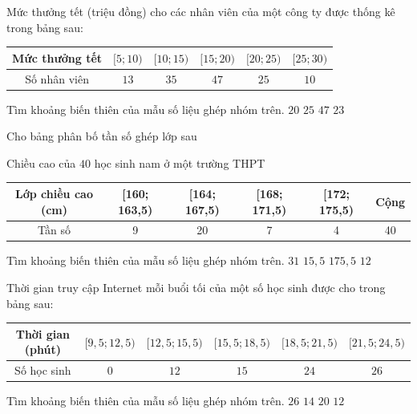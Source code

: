 \begin{ex}
	Mức thưởng tết (triệu đồng) cho các nhân viên của một công ty được thống kê trong bảng sau:
	\vspace*{-10pt}
	\begin{center}
		\begin{tabular}{|c|c|c|c|c|c|}
			\hline Mức thưởng tết & {$[5 ; 10)$} & {$[10 ; 15)$} & {$[15 ; 20)$} & {$[20 ; 25)$} &  {$[25 ;30)$} \\
			\hline Số nhân viên & $13$ & $35$ & $47$ & $25$ & $10$  \\
			\hline
		\end{tabular}
	\end{center}
	Tìm khoảng biến thiên của mẫu số liệu ghép nhóm trên.
	\choice
	{$20$}
	{\True $25$}
	{$47$}
	{$23$}
\end{ex}

\begin{ex}
	Cho bảng phân bố tần số ghép lớp sau
	\vspace*{-10pt}
	\begin{center}
		Chiều cao của $40$ học sinh nam ở một trường THPT\\
		\begin{tabular}{|c|c|c|c|c|c|}
			\hline
			Lớp chiều cao (cm) & [160; 163,5) & [164; 167,5) & [168; 171,5) & [172; 175,5) & Cộng\\
			\hline
			Tần số & 9 & 20 & 7 & 4 & 40\\
			\hline
		\end{tabular}
	\end{center}
	Tìm khoảng biến thiên của mẫu số liệu ghép nhóm trên.
	\choice
	{$31$}
	{\True $15,5$}
	{$175,5$}
	{$12$}
\end{ex}


\begin{ex}
	Thời gian truy cập Internet mỗi buổi tối của một số học sinh được cho trong bảng sau:
	\begin{center}
		\begin{tabular}{|c|c|c|c|c|c|}
			\hline Thời gian (phút) & {$[9{,}5 ; 12{,}5)$} & {$[12{,}5 ; 15{,}5)$} & {$[15{,}5 ; 18{,}5)$} & {$[18{,}5 ; 21{,}5)$} & {$[21{,}5 ; 24{,}5)$} \\
			\hline Số học sinh & $0$ & $12$ & $15$ & $24$ & $26$ \\
			\hline
		\end{tabular}
	\end{center}
	Tìm khoảng biến thiên của mẫu số liệu ghép nhóm trên.
	\choice
	{$26$}
	{$14$}
	{$20$}
	{\True $12$}
\end{ex}

